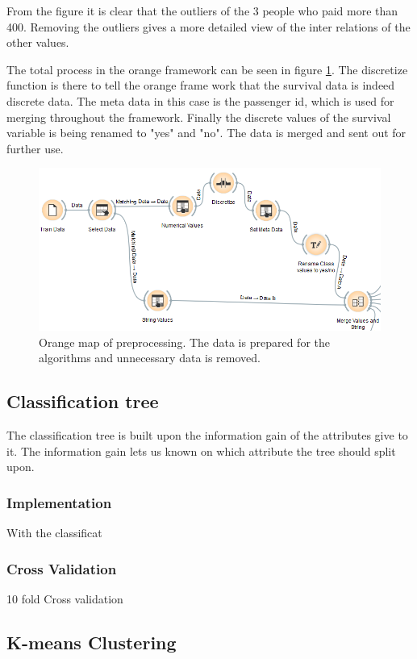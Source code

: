 \documentclass[a4paper,11pt]{article}
\begin{document}
From the figure it is clear that the outliers of the 3 people who paid more than 400. Removing the outliers gives a more detailed view of the inter relations of the other values.

The total process in the orange framework can be seen in figure \ref{preprocessMap}. The discretize function is there to tell the orange frame work that the survival data is indeed discrete data. The meta data in this case is the passenger id, which is used for merging throughout the framework. Finally the discrete values of the survival variable is being renamed to "yes" and "no". The data is merged and sent out for further use.

\begin{figure}
	\begin{center}
	\includegraphics[scale=0.7]{PreprocessMap}
	\end{center}
	\caption{Orange map of preprocessing. The data is prepared for the algorithms and unnecessary data is removed.}
	\label{preprocessMap}
\end{figure}

\subsection{Classification tree}
The classification tree is built upon the information gain of the attributes give to it. The information gain lets us known on which attribute the tree should split upon.
\subsubsection{Implementation}
With the classificat 
\subsubsection{Cross Validation}
10 fold Cross validation
\subsection{K-means Clustering}
\end{document}
